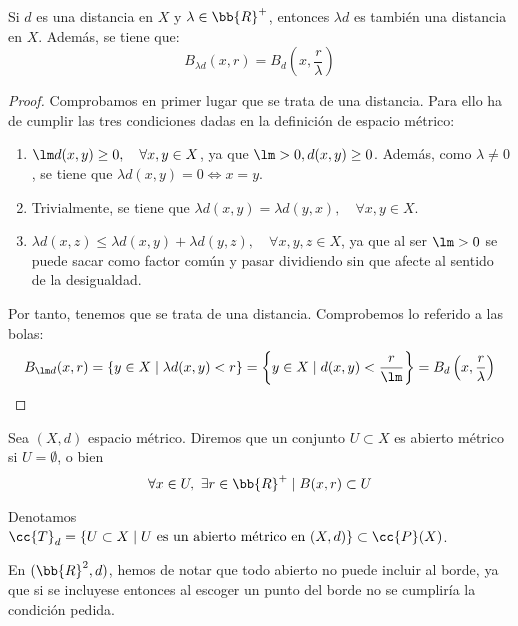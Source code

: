 \begin{prop}
    Si $d$ es una distancia en $X$ y $\lambda\in \bb{R}^+$, entonces $\lambda d$ es también una distancia en $X$. Además, se tiene que:
    \begin{equation*}
        B_{\lambda d}(x,r) = B_d\left(x, \frac{r}{\lambda}\right)
    \end{equation*}
\end{prop}
\begin{proof}
    Comprobamos en primer lugar que se trata de una distancia. Para ello ha de cumplir las tres condiciones dadas en la definición de espacio métrico:
    \begin{enumerate}
        \item $\lm d(x,y)\geq 0, \quad \forall x,y\in X$, ya que $\lm>0, d(x,y)\geq 0$. Además, como $\lambda\neq 0$, se tiene que $\lambda d(x,y)=0 \Longleftrightarrow x=y$.

        \item Trivialmente, se tiene que $\lambda d(x,y)=\lambda d(y,x), \quad \forall x,y\in X$.

        \item $\lambda d(x,z)\leq \lambda d(x,y) + \lambda d(y,z), \quad \forall x,y,z\in X$, ya que al ser $\lm>0$ se puede sacar como factor común y pasar dividiendo sin que afecte al sentido de la desigualdad.
    \end{enumerate}

    Por tanto, tenemos que se trata de una distancia. Comprobemos lo referido a las bolas:
    \begin{equation*}
        B_{\lm d}(x,r)
        = \{y\in X \mid \lambda d(x,y)<r\}
        = \left\{y\in X \mid d(x,y)<\dfrac{r}{\lm}\right\}
        = B_d\left(x, \frac{r}{\lambda}\right)
    \end{equation*}
\end{proof}

\begin{definicion}
Sea $(X,d)$ espacio métrico. Diremos que un conjunto $U\subset X$ es abierto métrico si $U=\emptyset$, o bien
$$\forall x\in U,~\exists r\in \bb{R}^+\mid B(x,r)\subset U$$

Denotamos $\cc{T}_d=\{U\subset X\mid U\text{ es un abierto métrico en } (X,d)\}\subset \cc{P}(X)$. 
\end{definicion}

\begin{ejemplo}
    En $(\bb{R}^2, d)$, hemos de notar que todo abierto no puede incluir al borde, ya que si se incluyese entonces al escoger un punto del borde no se cumpliría la condición pedida.
\end{ejemplo}


